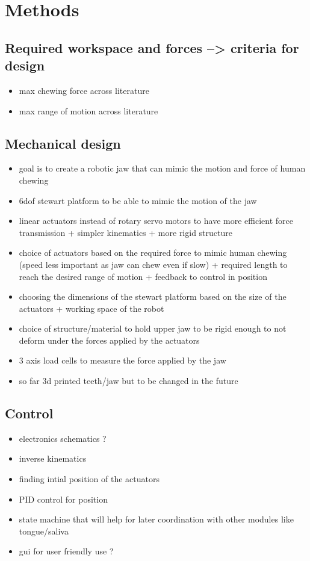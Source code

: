 \section{Methods}

\subsection{Required workspace and forces --> criteria for design}
\begin{itemize}
    \item max chewing force across literature
    \item max range of motion across literature
\end{itemize}

\subsection{Mechanical design}
\begin{itemize}
    \item goal is to create a robotic jaw that can mimic the motion and force of human chewing 
    \item 6dof stewart platform to be able to mimic the motion of the jaw
    \item linear actuators instead of rotary servo motors to have more efficient force transmission + simpler kinematics + more rigid structure
    \item choice of actuators based on the required force to mimic human chewing (speed less important as jaw can chew even if slow) + required length to 
    reach the desired range of motion + feedback to control in position
    \item choosing the dimensions of the stewart platform based on the size of the actuators + working space of the robot
    \item choice of structure/material to hold upper jaw to be rigid enough to not deform under the forces applied by the actuators 
    \item 3 axis load cells to measure the force applied by the jaw
    \item so far 3d printed teeth/jaw but to be changed in the future
\end{itemize}

\subsection{Control}
\begin{itemize}
    \item electronics schematics ?
    \item inverse kinematics
    \item finding intial position of the actuators
    \item PID control for position
    \item state machine that will help for later coordination with other modules like tongue/saliva
    \item gui for user friendly use ?
\end{itemize}


